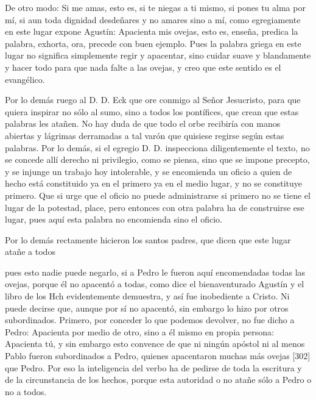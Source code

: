 De otro modo: Si me amas, esto es, si te niegas a ti mismo, si pones tu alma por mí, si aun toda dignidad desdeñares y no amares sino a mí, como egregiamente en este lugar expone Agustín: Apacienta mis ovejas, esto es, enseña, predica la palabra, exhorta, ora, precede con buen ejemplo. Pues la palabra griega en este lugar no significa simplemente regir y apacentar, sino cuidar suave y blandamente y hacer todo para que nada falte a las ovejas, y creo que este sentido es el evangélico.

Por lo demás ruego al D. D. Eck que ore conmigo al Señor Jesucristo, para que quiera inspirar no sólo al sumo, sino a todos los pontífices, que crean que estas palabras les atañen. No hay duda de que todo el orbe recibiría con manos abiertas y lágrimas derramadas a tal varón que quisiese regirse según estas palabras. Por lo demás, si el egregio D. D. inspecciona diligentemente el texto, no se concede allí derecho ni privilegio, como se piensa, sino que se impone precepto, y se injunge un trabajo hoy intolerable, y se encomienda un oficio a quien de hecho está constituido ya en el primero ya en el medio lugar, y no se constituye primero. Que si urge que el oficio no puede administrarse si primero no se tiene el lugar de la potestad, place, pero entonces con otra palabra ha de construirse ese lugar, pues aquí esta palabra no encomienda sino el oficio.

Por lo demás rectamente hicieron los santos padres, que dicen que este lugar atañe a todos

pues esto nadie puede negarlo, si a Pedro le fueron aquí encomendadas todas las ovejas, porque él no apacentó a todas, como dice el bienaventurado Agustín y el libro de los Hch evidentemente demuestra, y así fue inobediente a Cristo. Ni puede decirse que, aunque por sí no apacentó, sin embargo lo hizo por otros subordinados. Primero, por conceder lo que podemos devolver, no fue dicho a Pedro: Apacienta por medio de otro, sino a él mismo en propia persona: Apacienta tú, y sin embargo esto convence de que ni ningún apóstol ni al menos Pablo fueron subordinados a Pedro, quienes apacentaron muchas más ovejas [302] que Pedro. Por eso la inteligencia del verbo ha de pedirse de toda la escritura y de la circunstancia de los hechos, porque esta autoridad o no atañe sólo a Pedro o no a todos.

